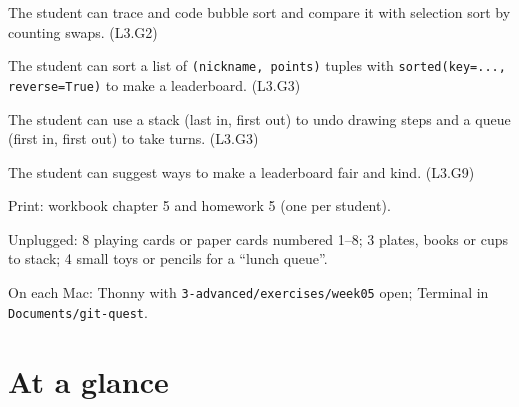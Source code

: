 
\begin{objectives}
  \item The student can trace and code bubble sort and compare it with selection sort by counting swaps. (L3.G2)
  \item The student can sort a list of \texttt{(nickname, points)} tuples with \texttt{sorted(key=..., reverse=True)} to make a leaderboard. (L3.G3)
  \item The student can use a stack (last in, first out) to undo drawing steps and a queue (first in, first out) to take turns. (L3.G3)
  \item The student can suggest ways to make a leaderboard fair and kind. (L3.G9)
\end{objectives}

\begin{materials}
  \item Print: workbook chapter 5 and homework 5 (one per student).
  \item Unplugged: 8 playing cards or paper cards numbered 1--8; 3 plates, books or cups to stack; 4 small toys or pencils for a \enquote{lunch queue}.
  \item On each Mac: Thonny with \texttt{3-advanced/exercises/week05} open; Terminal in \texttt{Documents/git-quest}.
\end{materials}

\section{At a glance}
\begin{timeplan}
\end{timeplan}

